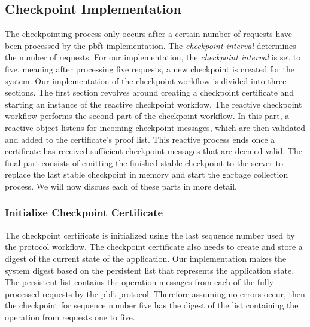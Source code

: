 \subsection{Checkpoint Implementation}
\label{section:ImpCheckpointing}
The checkpointing process only occurs after a certain number of requests have been processed by the \ac{pbft} implementation. The \emph{checkpoint interval} determines the number of requests.
For our implementation, the \emph{checkpoint interval} is set to five, meaning after processing five requests, a new checkpoint is created for the system. Our implementation of the checkpoint workflow is divided into three sections. The first section revolves around creating a checkpoint certificate and starting an instance of the reactive checkpoint workflow. The reactive checkpoint workflow performs the second part of the checkpoint workflow. In this part, a reactive  object listens for incoming checkpoint messages, which are then validated and added to the certificate’s proof list. This reactive process ends once a certificate has received sufficient checkpoint messages that are deemed valid. The final part consists of emitting the finished stable checkpoint to the server to replace the last stable checkpoint in memory and start the garbage collection process. We will now discuss each of these parts in more detail.

\subsubsection{Initialize Checkpoint Certificate}
The checkpoint certificate is initialized using the last sequence number used by the protocol workflow. The checkpoint certificate also needs to create and store a digest of the current state of the application. Our implementation makes the system digest based on the persistent list that represents the application state. The persistent list contains the operation messages from each of the fully processed requests by the \ac{pbft} protocol. Therefore assuming no errors occur, then the checkpoint for sequence number five has the digest of the list containing the operation from requests one to five. 

